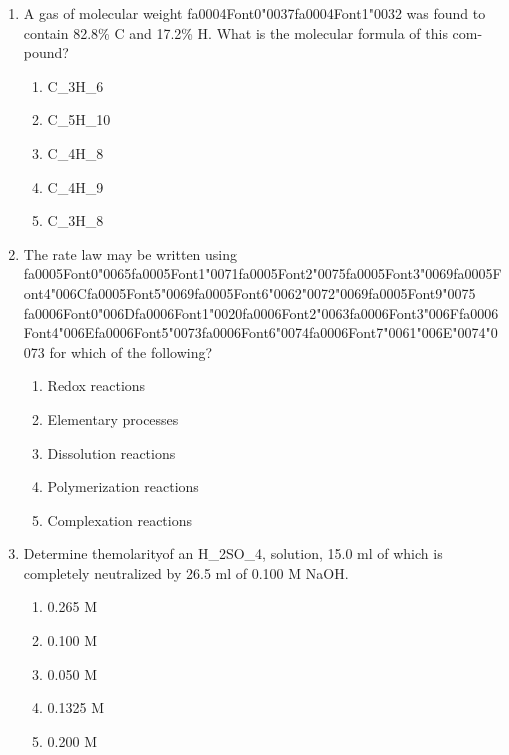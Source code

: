 \documentclass[12pt]{article}
\begin{document}
\begin{enumerate}[label=\arabic*.]
\begin{enumerate}[label=(\alph*)]
    \item The atomic radius of hydrogen is one tenth the first Bohr radius
    \item The atomic radius of hydrogen is larger than the first Bohr radius
\end{enumerate}
\item A gas of molecular weight {\csname fa0004Font0\endcsname\char"0037}{\csname fa0004Font1\endcsname\char"0032} was found to contain 82.8\% C and 17.2\% H. What is the
molecular formula of this com-pound?
\begin{enumerate}[label=(\alph*)]
    \item C\_3H\_6
    \item C\_5H\_10
    \item C\_4H\_8
    \item C\_4H\_9
    \item C\_3H\_8
\end{enumerate}
\item The rate law may be written using {\csname fa0005Font0\endcsname\char"0065}{\csname fa0005Font1\endcsname\char"0071}{\csname fa0005Font2\endcsname\char"0075}{\csname fa0005Font3\endcsname\char"0069}{\csname fa0005Font4\endcsname\char"006C}{\csname fa0005Font5\endcsname\char"0069}{\csname fa0005Font6\endcsname\char"0062}{\char"0072}{\char"0069}{\csname fa0005Font9\endcsname\char"0075} {\csname fa0006Font0\endcsname\char"006D}{\csname fa0006Font1\endcsname\char"0020}{\csname fa0006Font2\endcsname\char"0063}{\csname fa0006Font3\endcsname\char"006F}{\csname fa0006Font4\endcsname\char"006E}{\csname fa0006Font5\endcsname\char"0073}{\csname fa0006Font6\endcsname\char"0074}{\csname fa0006Font7\endcsname\char"0061}{\char"006E}{\char"0074}{\char"0073} for which of the following?
\begin{enumerate}[label=(\alph*)]
    \item Redox reactions
    \item Elementary processes
    \item Dissolution reactions
    \item Polymerization reactions
    \item Complexation reactions
\end{enumerate}
\item Determine themolarityof an H\_2SO\_4, solution, 15.0 ml of which is completely neutralized
by 26.5 ml of 0.100 M NaOH.
\begin{enumerate}[label=(\alph*)]
    \item 0.265 M
    \item 0.100 M
    \item 0.050 M
    \item 0.1325 M
    \item 0.200 M
\end{enumerate}
\end{enumerate}
\end{document}
